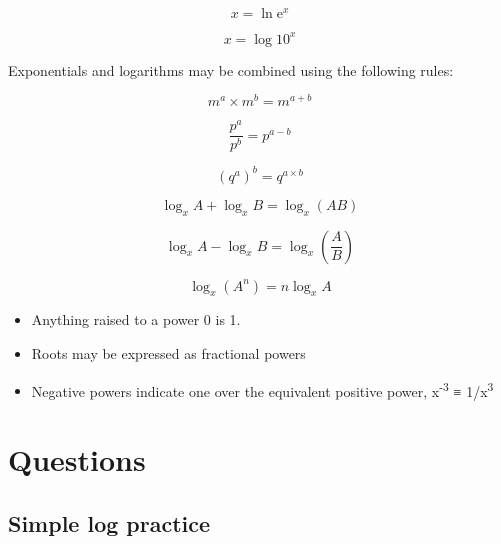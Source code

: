 \documentclass[
]{book}
\providecommand{\tightlist}{%
  \setlength{\itemsep}{0pt}\setlength{\parskip}{0pt}}
\begin{document}
\begin{equation*}
x = \ln \textrm{e}^x
\end{equation*}

\begin{equation*}
x = \log 10^x
\end{equation*}

Exponentials and logarithms may be combined using the following rules:

\begin{equation}
m^a \times m^b = m^{a+b}
\label{eq:combpowermult}
\end{equation}

\begin{equation}
\frac{p^a}{p^b} = p^{a - b}
\label{eq:combpowerdiv}
\end{equation}

\begin{equation}
\left(q^a\right)^b =  q^{a\times b}
\label{eq:combpowerraise}
\end{equation}

\begin{equation}
\log_x A + \log_x B = \log_x (AB)
\label{eq:logadd}
\end{equation}

\begin{equation}
\log_x A  - \log_x B = \log_x \left(\frac{A}{B}\right)
\label{eq:logsub}
\end{equation}

\begin{equation}
\log_x (A^n)= n \log_x A
\label{eq:logpower}
\end{equation}

\begin{itemize}
\tightlist
\item
  Anything raised to a power 0 is 1.
\item
  Roots may be expressed as fractional powers
\item
  Negative powers indicate one over the equivalent positive power, x\textsuperscript{-3} ≡ 1/x\textsuperscript{3}
\end{itemize}

\hypertarget{sec:Questions2}{%
\section{Questions}\label{sec:Questions2}}

\hypertarget{sec:logpractice}{%
\subsection{Simple log practice}\label{sec:logpractice}}
\end{document}
